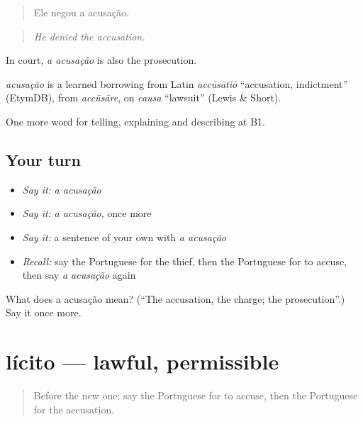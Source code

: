 \begin{quote}
Ele negou a acusação.
\end{quote}

\begin{quote}
\emph{He denied the accusation.}
\end{quote}

In court, \emph{a acusação} is also the prosecution.

\begin{cousinweb}
\emph{acusação} is a learned borrowing from Latin \emph{accūsātiō} \textquotedblleft{}accusation, indictment\textquotedblright{} (EtymDB), from \emph{accūsāre}, on \emph{causa} \textquotedblleft{}lawsuit\textquotedblright{} (Lewis \& Short).
\end{cousinweb}

\begin{grammarlens}[title={What you've built}]
One more word for telling, explaining and describing at B1.
\end{grammarlens}

\subsection*{Your turn}
\begin{itemize}
\raggedright
  \item \emph{Say it:} \emph{a acusação}
  \item \emph{Say it:} \emph{a acusação}, once more
  \item \emph{Say it:} a sentence of your own with \emph{a acusação}
  \item \emph{Recall:} say the Portuguese for the thief, then the Portuguese for to accuse, then say \emph{a acusação} again
\end{itemize}

\begin{tcolorbox}[breakable,colback=teal!4,colframe=teal!35!black,title={Before you move on}]
What does a acusação mean? (\textquotedblleft{}The accusation, the charge; the prosecution\textquotedblright{}.) Say it once more.
\end{tcolorbox}
\section[lícito]{lícito — lawful, permissible}

\label{lesson:PT-C386-licito}



\begin{quote}
Before the new one: say the Portuguese for to accuse, then the Portuguese for the accusation.
\end{quote}

